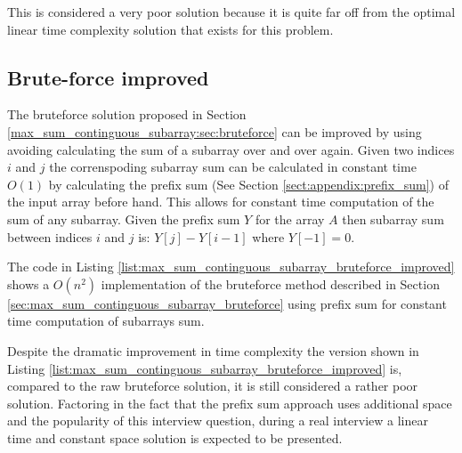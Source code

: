 

This is considered a very poor solution because it is quite far off from the optimal linear time complexity solution that exists for this problem. 

\subsection{Brute-force improved}
\label{max_sum_continguous_subarray:sec:bruteforce_improved}
The bruteforce solution proposed in Section \ref{max_sum_continguous_subarray:sec:bruteforce} can be improved by using avoiding  calculating the sum of a subarray over and over again. Given two indices $i$ and $j$ the correnspoding subarray sum can be calculated in constant time $O(1)$ by calculating the prefix sum (See Section \ref{sect:appendix:prefix_sum}) of the input array before hand. This allows for constant time computation of the sum of any subarray. Given the prefix sum $Y$ for the array $A$ then subarray sum between indices $i$ and $j$ is:
$Y[j]-Y[i-1]$ where $Y[-1] = 0$.

The code in Listing \ref{list:max_sum_continguous_subarray_bruteforce_improved} shows a $O(n^2)$ implementation of the bruteforce method described in Section \ref{sec:max_sum_continguous_subarray_bruteforce}  using prefix sum for constant time computation of subarrays sum.



Despite the dramatic improvement in time complexity the version shown in Listing \ref{list:max_sum_continguous_subarray_bruteforce_improved} is, compared to the raw bruteforce solution, it is still considered a rather poor solution. Factoring in the fact that the prefix sum approach uses additional space and the popularity of this interview question, during a real interview a linear time and constant space solution is expected to be presented.

